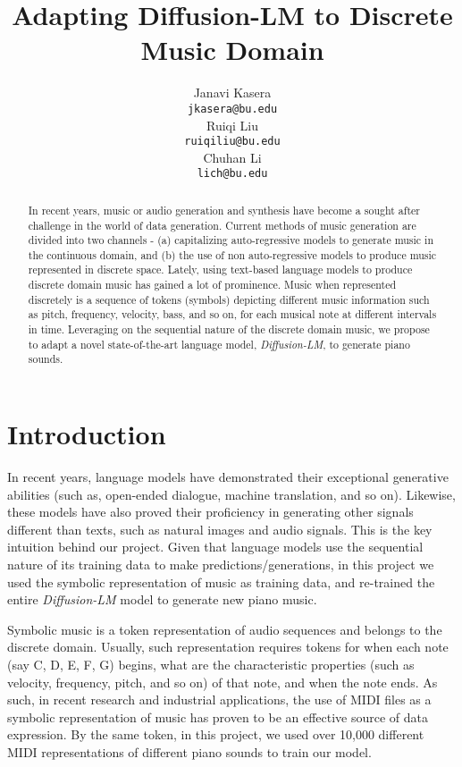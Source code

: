 \documentclass{article}
\title{Adapting Diffusion-LM to Discrete Music Domain}
\author{%
  Janavi Kasera\\
  \texttt{jkasera@bu.edu} \\
  \AND 
  Ruiqi Liu\\
  \texttt{ruiqiliu@bu.edu} \\
  \AND
  Chuhan Li \\
  \texttt{lich@bu.edu} \\
}
\begin{document}
\maketitle


\begin{abstract}

In recent years, music or audio generation and synthesis have become a sought after challenge in the world of data generation. Current methods of music generation are divided into two channels - (a) capitalizing auto-regressive models to generate music in the continuous domain, and (b) the use of non auto-regressive models to produce music represented in discrete space. Lately, using text-based language models to produce discrete domain music has gained a lot of prominence. Music when represented discretely is a sequence of tokens (symbols) depicting different music information such as pitch, frequency, velocity, bass, and so on, for each musical note at different intervals in time. Leveraging on the sequential nature of the discrete domain music, we propose to adapt a novel state-of-the-art language model, \textit{Diffusion-LM}, to generate piano sounds. 

\end{abstract}


\section{Introduction}

In recent years, language models have demonstrated their exceptional generative abilities (such as, open-ended dialogue, machine translation, and so on). Likewise, these models have also proved their proficiency in generating other signals different than texts, such as natural images and audio signals. This is the key intuition behind our project. Given that language models use the sequential nature of its training data to make predictions/generations, in this project we used the symbolic representation of music as training data, and re-trained the entire \textit{Diffusion-LM} model to generate new piano music. 

Symbolic music is a token representation of audio sequences and belongs to the discrete domain. Usually, such representation requires tokens for when each note (say C, D, E, F, G) begins, what are the characteristic properties (such as velocity, frequency, pitch, and so on) of that note, and when the note ends. As such, in recent research and industrial applications, the use of MIDI files as a symbolic representation of music has proven to be an effective source of data expression. By the same token, in this project, we used over 10,000 different MIDI representations of different piano sounds to train our model. 
\end{document}
